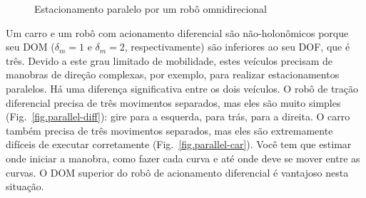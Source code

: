 {\begin{figure}
\begin{center}
\end{center}
\caption{Estacionamento paralelo por um robô omnidirecional}\label{fig.parallel-omni}
\end{figure}

Um carro e um robô com acionamento diferencial são não-holonômicos porque seu DOM ($\delta_m=1$ e $\delta_m=2$, respectivamente) são inferiores ao seu DOF, que é três. Devido a este grau limitado de mobilidade, estes veículos precisam de manobras de direção complexas, por exemplo, para realizar estacionamentos paralelos. Há uma diferença significativa entre os dois veículos. O robô de tração diferencial precisa de três movimentos separados, mas eles são muito simples (Fig.~\ref{fig.parallel-diff}): gire para a esquerda, para trás, para a direita. O carro também precisa de três movimentos separados, mas eles são extremamente difíceis de executar corretamente (Fig.~\ref{fig.parallel-car}). Você tem que estimar onde iniciar a manobra, como fazer cada curva e até onde deve se mover entre as curvas. O DOM superior do robô de acionamento diferencial é vantajoso nesta situação.

}
